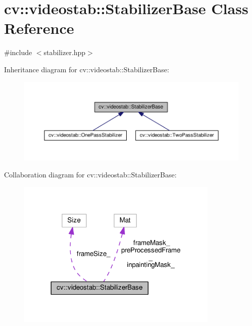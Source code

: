 \hypertarget{classcv_1_1videostab_1_1StabilizerBase}{\section{cv\-:\-:videostab\-:\-:Stabilizer\-Base Class Reference}
\label{classcv_1_1videostab_1_1StabilizerBase}
}


{\ttfamily \#include $<$stabilizer.\-hpp$>$}



Inheritance diagram for cv\-:\-:videostab\-:\-:Stabilizer\-Base\-:\nopagebreak
\begin{figure}[H]
\begin{center}
\leavevmode
\includegraphics[width=350pt]{classcv_1_1videostab_1_1StabilizerBase__inherit__graph}
\end{center}
\end{figure}


Collaboration diagram for cv\-:\-:videostab\-:\-:Stabilizer\-Base\-:\nopagebreak
\begin{figure}[H]
\begin{center}
\leavevmode
\includegraphics[width=272pt]{classcv_1_1videostab_1_1StabilizerBase__coll__graph}
\end{center}
\end{figure}
